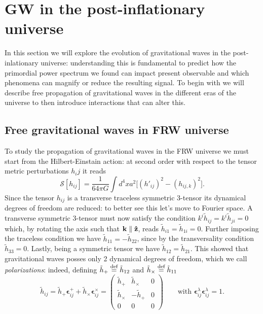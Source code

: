 \chapter{GW in the post-inflationary universe}
In this section we will explore the evolution of gravitational waves in the post-inlationary universe: understanding this is fundamental to predict how the primordial power spectrum we found can impact present observable and which phenomena can magnify or reduce the resulting signal. To begin with we will describe free propagation of gravitational waves in the different eras of the universe to then introduce interactions that can alter this. 

\section{Free gravitational waves in FRW universe}
\label{sec:free_GW}
To study the propagation of gravitational waves in the FRW universe we must start from the Hilbert-Einstain action: at second order with respect to the tensor metric perturbations $h_ij$ it reads
\begin{equation*}
    \mathcal{S} [h_{ij}]=\frac{1}{64\pi G}\int d^4xa^2\Big[(h'_{ij})^2-(h_{ij,k})^2\Big].
\end{equation*}
Since the tensor $h_{ij}$ is a transverse traceless symmetric 3-tensor its dynamical degrees of freedom are reduced: to better see this let's move to Fourier space. A transverse symmetric 3-tensor must now satisfy the condition $k^i\tilde h_{ij}=k^i \tilde h_{ji}=0$ which, by rotating the axis such that $\mathbf k\parallel\mathbf{\hat{z}}$, reads $\tilde{h}_{i1}=\tilde{h}_{1i}=0$. Further imposing the traceless condition we have $\tilde{h}_{11}=-\tilde h_{22}$, since by the transversality condition $\tilde{h}_{33}=0$. Lastly, being a symmetric tensor we have $\tilde{h}_{12}=\tilde{h}_{21}$. This showed that gravitational waves posses only 2 dynamical degrees of freedom, which we call \emph{polarizations}: indeed, defining $\tilde{h}_+\stackrel{\text{def}}{=}\tilde{h}_{12}$ and $ \tilde{h}_\times\stackrel{\text{def}}{=}\tilde{h}_{11}$
\begin{equation}
    \tilde{h}_{ij}=\tilde{h}_+\boldsymbol{\epsilon}_{ij}^++\tilde{h}_{\times}\boldsymbol{\epsilon}_{ij}^\times=
    \begin{pmatrix}
\tilde h_+ & \tilde h_\times & 0  \\ 
\tilde h_\times & -\tilde h_+ & 0  \\
0&0&0
    \end{pmatrix}\qquad\text{with }\boldsymbol{\epsilon}^\lambda_{ij}\boldsymbol{\epsilon}^{\lambda}_{ij}=1.
    \label{eq:GW-polarizations}
\end{equation}
